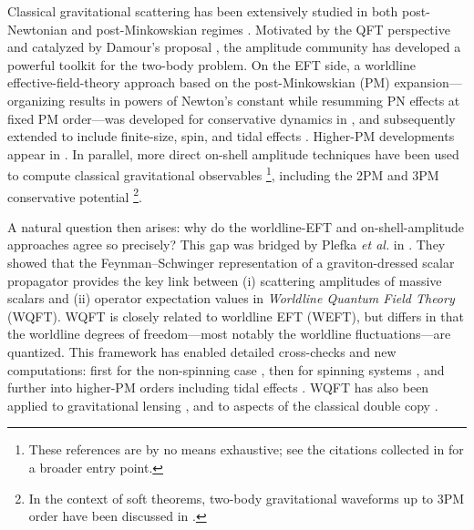 Classical gravitational scattering has been extensively studied in both post-Newtonian and post-Minkowskian regimes
\cite{hyp,hyp1,hyp2,hyp3,hyp4,hyp5,hyp6,hyp7,hyp8,hyp9,hyp10,hyp11,hyp12,hyp13,hyp16,hyp14,Damour:2016gwp,Bini:2017wfr,Bini:2017xzy,Damour:2017zjx,Damour:2019lcq,Bini:2020flp,Bini:2020uiq,Damour:2020tta,Bini:2020rzn,Bini:2021gat,Bini:2022enm,Damour:2022ybd,Bini:2022wrq,Rettegno:2023ghr,Bini:2023fiz,Ceresole:2023wxg}.
Motivated by the QFT perspective and catalyzed by Damour’s proposal \cite{Damour:2017zjx}, the amplitude community has developed a powerful toolkit for the two-body problem. On the EFT side, a worldline effective-field-theory approach based on the post-Minkowskian (PM) expansion—organizing results in powers of Newton’s constant while resumming PN effects at fixed PM order—was developed for conservative dynamics in \cite{Kalin:2020mvi}, and subsequently extended to include finite-size, spin, and tidal effects \cite{Bini:2020flp,Cheung:2020sdj,Kalin:2020lmz,Haddad:2020que}. Higher-PM developments appear in \cite{Kalin:2020fhe,Dlapa:2021npj,Dlapa:2021vgp,Kalin:2022hph,Jinno:2022sbr,Dlapa:2022lmu,Dlapa:2023hsl,Riva:2021vnj}. In parallel, more direct on-shell amplitude techniques have been used to compute classical gravitational observables
\cite{PhysRevD.7.2317,Holstein:2004dn,Neill:2013wsa,Bjerrum-Bohr:2013bxa,Luna:2017dtq,Bjerrum-Bohr:2018xdl,Kosower:2018adc,Cristofoli:2021vyo,DeAngelis:2023lvf,Brandhuber:2023hhl,Aoude:2023dui,Brandhuber:2023hhy,Georgoudis:2023eke,Herderschee:2023fxh}\footnote{These references are by no means exhaustive; see the citations collected in \cite{Buonanno:2022pgc} for a broader entry point.},
including the 2PM and 3PM conservative potential \cite{Bjerrum-Bohr:2018xdl,Cheung:2018wkq,Cristofoli:2019neg,Cheung:2020gyp,Bern:2019nnu,Bern:2019crd}\footnote{In the context of soft theorems, two-body gravitational waveforms up to 3PM order have been discussed in \cite{ashoke,ashoke1,ashoke2,ashoke3,ashoke4,ashoke5,ashoke6}.}.

A natural question then arises: why do the worldline-EFT and on-shell-amplitude approaches agree so precisely? This gap was bridged by Plefka \emph{et al.} in \cite{Mogull:2020sak}. They showed that the Feynman--Schwinger representation of a graviton-dressed scalar propagator provides the key link between (i) scattering amplitudes of massive scalars and (ii) operator expectation values in \emph{Worldline Quantum Field Theory} (WQFT). WQFT is closely related to worldline EFT (WEFT), but differs in that the worldline degrees of freedom—most notably the worldline fluctuations—are quantized. This framework has enabled detailed cross-checks and new computations: first for the non-spinning case \cite{Jakobsen:2021smu}, then for spinning systems \cite{Jakobsen:2021lvp,Jakobsen:2021zvh,Jakobsen:2023ndj,Jakobsen:2023hig}, and further into higher-PM orders including tidal effects \cite{Jakobsen:2023pvx}. WQFT has also been applied to gravitational lensing \cite{Bastianelli:2021nbs}, and to aspects of the classical double copy \cite{Shi:2021qsb, Diaz-Jaramillo:2021wtl,Comberiati:2022cpm}.


